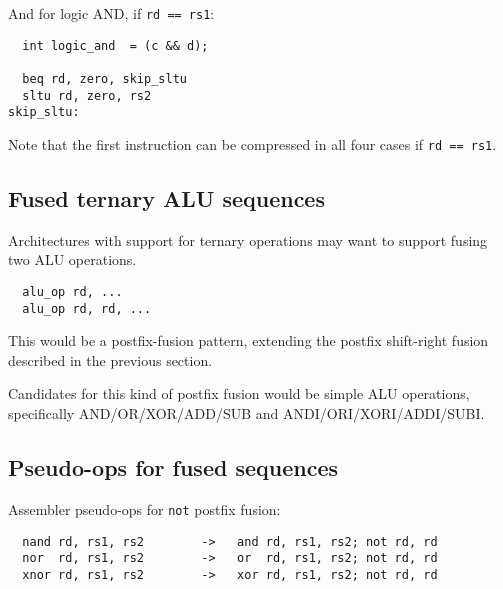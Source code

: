 And for logic AND, if {\tt rd == rs1}:

\begin{minipage}{\linewidth}
\begin{verbatim}
  int logic_and  = (c && d);

  beq rd, zero, skip_sltu
  sltu rd, zero, rs2
skip_sltu:
\end{verbatim}
\end{minipage}

Note that the first instruction can be compressed in all four cases if {\tt rd == rs1}.


\subsection{Fused ternary ALU sequences}

Architectures with support for ternary operations may want to support fusing two ALU operations.

\begin{minipage}{\linewidth}
\begin{verbatim}
  alu_op rd, ...
  alu_op rd, rd, ...
\end{verbatim}
\end{minipage}

This would be a postfix-fusion pattern, extending the postfix shift-right
fusion described in the previous section.

Candidates for this kind of postfix fusion would be simple ALU operations, specifically
AND/OR/XOR/ADD/SUB and ANDI/ORI/XORI/ADDI/SUBI.


\subsection{Pseudo-ops for fused sequences}

Assembler pseudo-ops for {\tt not} postfix fusion:

\begin{minipage}{\linewidth}
\begin{verbatim}
  nand rd, rs1, rs2        ->   and rd, rs1, rs2; not rd, rd
  nor  rd, rs1, rs2        ->   or  rd, rs1, rs2; not rd, rd
  xnor rd, rs1, rs2        ->   xor rd, rs1, rs2; not rd, rd
\end{verbatim}
\end{minipage}

